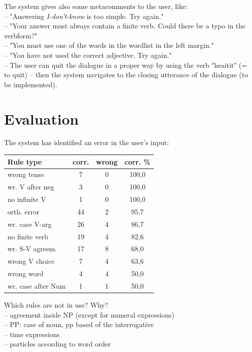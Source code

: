 \documentclass[11pt]{article}
\begin{document}
The system gives also some metacomments to the user, like:\\
-- "Answering \textit{I-don't-know} is too simple. Try again."\\
-- "Your answer must always contain a finite verb. Could there be a typo in the verbform?"\\
-- "You must use one of the words in the wordlist in the left margin."\\
-- "You have not used the correct adjective. Try again." \\
-- The user can quit the dialogue in a proper way by using the verb "heaitit" (= to quit) -- then the system navigates to the closing utterance of the dialogue (to be implemented).\\


\section{Evaluation}
 
The system has identified an error in the user's input:
\begin{table}[htbp]
\begin{tabular}{|l|c|c|c|}
\hline 
\textbf{Rule type}  & \textbf{corr.} & \textbf{wrong}   & \textbf{corr. \% }  \\
\hline 
wrong tense         & 7     & 0     & 100,0     \\ 
wr. V after neg   & 3     & 0     & 100,0     \\ 
no infinite V       & 1     & 0     & 100,0     \\ 
\hline 
orth. error         & 44    & 2     & 95,7      \\
wr. case V-arg  & 26    & 4     & 86,7      \\
no finite verb        & 19    & 4     &  82,6 \\
\hline 
wr. S-V agreem.   & 17    & 8     & 68,0 \\
wrong V choice        & 7     & 4     & 63,6 \\
\hline 
wrong word            & 4     & 4     & 50,0 \\
wr. case after Num  & 1     & 1     & 50,0 \\
\hline
\end{tabular}
\end{table}


Which rules are not in use? Why? \\
-- agreement inside NP (except for numeral expressions) \\
-- PP: case of noun, pp based of the interrogative  \\
-- time expressions \\
-- particles according to word order \\
\end{document}
